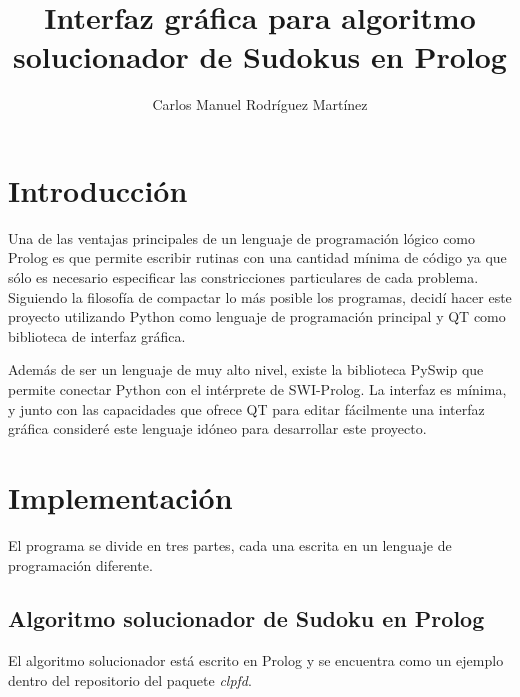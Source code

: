 \documentclass[10pt,a4paper]{article}
\author{Carlos Manuel Rodríguez Martínez}
\title{Interfaz gráfica para algoritmo solucionador de Sudokus en Prolog}
\begin{document}
\maketitle

\newpage

\tableofcontents

\newpage

\section{Introducción}
Una de las ventajas principales de un lenguaje de programación lógico como Prolog es que permite escribir rutinas con una cantidad mínima de código ya que sólo es necesario especificar las constricciones particulares de cada problema. Siguiendo la filosofía de compactar lo más posible los programas, decidí hacer este proyecto utilizando Python como lenguaje de programación principal y QT como biblioteca de interfaz gráfica.

Además de ser un lenguaje de muy alto nivel, existe la biblioteca PySwip que permite conectar Python con el intérprete de SWI-Prolog. La interfaz es mínima, y junto con las capacidades que ofrece QT para editar fácilmente una interfaz gráfica consideré este lenguaje idóneo para desarrollar este proyecto.

\section{Implementación}
El programa se divide en tres partes, cada una escrita en un lenguaje de programación diferente.

\subsection{Algoritmo solucionador de Sudoku en Prolog}
El algoritmo solucionador está escrito en Prolog y se encuentra como un ejemplo dentro del repositorio del paquete \emph{clpfd}.
\end{document}
